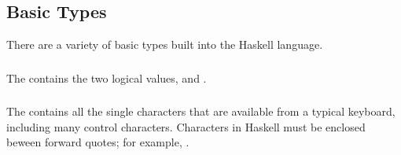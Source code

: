 \subsection{Basic Types}\label{subsec:Basic_Types}
There are a variety of basic types built into the Haskell language.

\subsubsection{\texorpdfstring{}{\texttt{Bool}}}\label{subsubsec:Bool_Type}
The   contains the two logical values,  and .

\subsubsection{\texorpdfstring{}{\texttt{Char}}}\label{subsubsec:Char_Type}
The   contains all the single characters that are available from a typical keyboard, including many control characters.
Characters in Haskell must be enclosed beween forward quotes; for example, .

\subsubsection{\texorpdfstring{}{\texttt{String}}}\label{subsubsec:String_Type}

\subsubsection{\texorpdfstring{}{\texttt{Int}}}\label{subsubsec:Int_Type}

\subsubsection{\texorpdfstring{}{\texttt{Integer}}}\label{subsubsec:Integer_Type}

\subsubsection{\texorpdfstring{}{\texttt{Float}}}\label{subsubsec:Float_Type}

